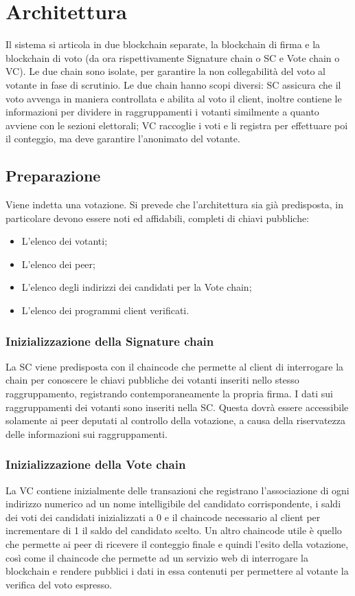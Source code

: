 \section{Architettura}
	Il sistema si articola in due blockchain separate, la blockchain di firma e la blockchain di voto (da ora rispettivamente Signature chain o SC e Vote chain o VC). Le due chain sono isolate, per garantire la non collegabilità del voto al votante in fase di scrutinio.
	Le due chain hanno scopi diversi: SC assicura che il voto avvenga in maniera controllata e abilita al voto il client, inoltre contiene le informazioni per dividere in raggruppamenti i votanti similmente a quanto avviene con le sezioni elettorali; VC raccoglie i voti e li registra per effettuare poi il conteggio, ma deve garantire l’anonimato del votante.
	
	\subsection{Preparazione}
		Viene indetta una votazione. Si prevede che l'architettura sia già predisposta, in particolare devono essere noti ed affidabili, completi di chiavi pubbliche:
		\begin{itemize}
			\item L'elenco dei votanti;
			\item L'elenco dei peer;
			\item L'elenco degli indirizzi dei candidati per la Vote chain;
			\item L'elenco dei programmi client verificati.
		\end{itemize}
		\subsubsection{Inizializzazione della Signature chain}
			La SC viene predisposta con il chaincode che permette al client di interrogare la chain per conoscere le chiavi pubbliche dei votanti inseriti nello stesso raggruppamento, registrando contemporaneamente la propria firma. I dati sui raggruppamenti dei votanti sono inseriti nella SC. Questa dovrà essere accessibile solamente ai peer deputati al controllo della votazione, a causa della riservatezza delle informazioni sui raggruppamenti.
		\subsubsection{Inizializzazione della Vote chain}
			La VC contiene inizialmente delle transazioni che registrano l'associazione di ogni indirizzo numerico ad un nome intelligibile del candidato corrispondente, i saldi dei voti dei candidati inizializzati a 0 e il chaincode necessario al client per incrementare di 1 il saldo del candidato scelto. Un altro chaincode utile è quello che permette ai peer di ricevere il conteggio finale e quindi l'esito della votazione, così come il chaincode che permette ad un servizio web di interrogare la blockchain e rendere pubblici i dati in essa contenuti per permettere al votante la verifica del voto espresso.
	
